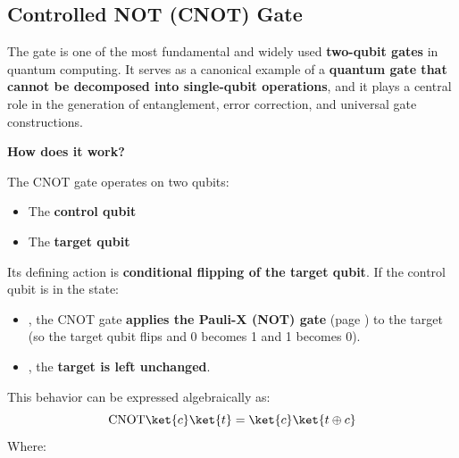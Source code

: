 \subsection{Controlled NOT (CNOT) Gate}\label{subsection: Controlled NOT Gate - CNOT}

The  gate is one of the most fundamental and widely used \textbf{two-qubit gates} in quantum computing. It serves as a canonical example of a \textbf{quantum gate that cannot be decomposed into single-qubit operations}, and it plays a central role in the generation of entanglement, error correction, and universal gate constructions.

\highspace
\begin{flushleft}
    \textcolor{Green3}{ \textbf{How does it work?}}
\end{flushleft}
The CNOT gate operates on two qubits:
\begin{itemize}
    \item The \textbf{control qubit} 
    \item The \textbf{target qubit} 
\end{itemize}
Its defining action is \textbf{conditional flipping of the target qubit}. If the control qubit is in the state:
\begin{itemize}
    \item {}, the CNOT gate \textbf{applies the Pauli-X (NOT) gate} (page \pageref{sec:pauli-x-not-gate}) to the target (so the target qubit flips and 0 becomes 1 and 1 becomes 0).
    \item {}, the \textbf{target is left unchanged}.
\end{itemize}
This behavior can be expressed algebraically as:
\begin{equation}
    \text{CNOT} \ket{c}\ket{t} = \ket{c} \ket{t \oplus c}    
\end{equation}
Where:
